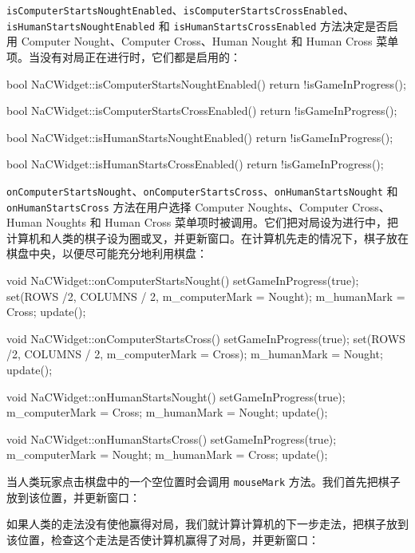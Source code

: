 \texttt{isComputerStartsNoughtEnabled}、\texttt{isComputerStartsCrossEnabled}、\texttt{isHumanStartsNoughtEnabled} 和 \texttt{isHumanStartsCrossEnabled} 方法决定是否启用 Computer Nought、Computer Cross、Human Nought 和 Human Cross 菜单项。当没有对局正在进行时，它们都是启用的：

\begin{codebox}
bool NaCWidget::isComputerStartsNoughtEnabled() {
  return !isGameInProgress();
}

bool NaCWidget::isComputerStartsCrossEnabled() {
  return !isGameInProgress();
}

bool NaCWidget::isHumanStartsNoughtEnabled() {
  return !isGameInProgress();
}

bool NaCWidget::isHumanStartsCrossEnabled() {
  return !isGameInProgress();
}
\end{codebox}

\texttt{onComputerStartsNought}、\texttt{onComputerStartsCross}、\texttt{onHumanStartsNought} 和 \texttt{onHumanStartsCross} 方法在用户选择 Computer Noughts、Computer Cross、Human Noughts 和 Human Cross 菜单项时被调用。它们把对局设为进行中，把计算机和人类的棋子设为圈或叉，并更新窗口。在计算机先走的情况下，棋子放在棋盘中央，以便尽可能充分地利用棋盘：

\begin{codebox}
void NaCWidget::onComputerStartsNought() {
  setGameInProgress(true);
  set(ROWS /2, COLUMNS / 2, m_computerMark = Nought);
  m_humanMark = Cross;
  update();
}

void NaCWidget::onComputerStartsCross() {
  setGameInProgress(true);
  set(ROWS /2, COLUMNS / 2, m_computerMark = Cross);
  m_humanMark = Nought;
  update();
}

void NaCWidget::onHumanStartsNought() {
  setGameInProgress(true);
  m_computerMark = Cross;
  m_humanMark = Nought;
  update();
}

void NaCWidget::onHumanStartsCross() {
  setGameInProgress(true);
  m_computerMark = Nought;
  m_humanMark = Cross;
  update();
}
\end{codebox}

当人类玩家点击棋盘中的一个空位置时会调用 \texttt{mouseMark} 方法。我们首先把棋子放到该位置，并更新窗口：

\begin{codebox}
void NaCWidget::mouseMark(int row, int column) {
  set(row, column, m_humanMark);
  update();
\end{codebox}

如果人类的走法没有使他赢得对局，我们就计算计算机的下一步走法，把棋子放到该位置，检查这个走法是否使计算机赢得了对局，并更新窗口：

